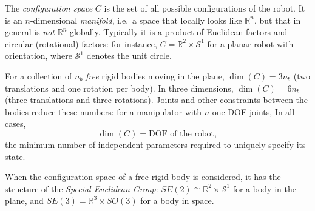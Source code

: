 \begin{definition}
The \emph{configuration space} \( C \) is the set of all possible
configurations of the robot. It is an \( n \)-dimensional
\emph{manifold}, i.e.\ a space that locally looks like
\( \mathbb{R}^n \), but that in general is \emph{not} \( \mathbb{R}^n \)
globally. Typically it is a product of Euclidean factors and circular
(rotational) factors: for instance,
\( C = \mathbb{R}^2 \times \mathcal{S}^1 \) for a planar robot with
orientation, where \( \mathcal{S}^1 \) denotes the unit circle.
\end{definition}

For a collection of \( n_b \) \emph{free} rigid bodies moving in the
plane, \( \dim(C) = 3 n_b \) (two translations and one rotation per
body). In three dimensions, \( \dim(C) = 6 n_b \) (three translations
and three rotations). Joints and other constraints between the bodies
reduce these numbers: for a manipulator with \( n \) one-DOF joints,
In all cases,
\[
\dim(C) = \text{DOF of the robot},
\]
the minimum number of independent parameters required to uniquely
specify its state.

When the configuration space of a free rigid body is considered, it has
the structure of the \emph{Special Euclidean Group}: \( SE(2) \cong
\mathbb{R}^2 \times \mathcal{S}^1 \) for a body in the plane, and
\( SE(3) = \mathbb{R}^3 \times SO(3) \) for a body in space.

